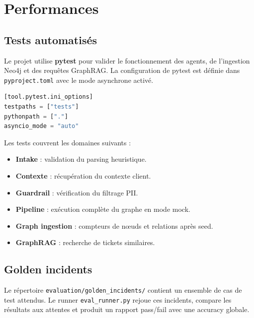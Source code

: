 \section{Performances}

\subsection{Tests automatisés}
Le projet utilise \textbf{pytest} pour valider le fonctionnement des agents, de l'ingestion Neo4j et des requêtes GraphRAG. La configuration de pytest est définie dans \texttt{pyproject.toml} avec le mode asynchrone activé.

\begin{lstlisting}[language=Python, caption={Configuration pytest dans pyproject.toml}]
[tool.pytest.ini_options]
testpaths = ["tests"]
pythonpath = ["."]
asyncio_mode = "auto"
\end{lstlisting}

Les tests couvrent les domaines suivants :

\begin{itemize}
    \setlength\itemsep{0.1em}
    \setlength\parskip{0pt}
    \setlength\parsep{0pt}
    \item \textbf{Intake} : validation du parsing heuristique.
    \item \textbf{Contexte} : récupération du contexte client.
    \item \textbf{Guardrail} : vérification du filtrage PII.
    \item \textbf{Pipeline} : exécution complète du graphe en mode mock.
    \item \textbf{Graph ingestion} : compteurs de nœuds et relations après seed.
    \item \textbf{GraphRAG} : recherche de tickets similaires.
\end{itemize}

\subsection{Golden incidents}
Le répertoire \texttt{evaluation/golden\_incidents/} contient un ensemble de cas de test attendus. Le runner \texttt{eval\_runner.py} rejoue ces incidents, compare les résultats aux attentes et produit un rapport pass/fail avec une accuracy globale.

